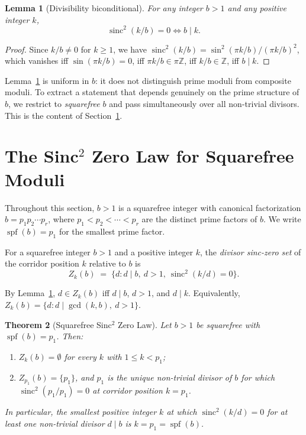\documentclass[11pt,reqno]{amsart}
\theoremstyle{plain}
\newtheorem{theorem}{Theorem}
\newtheorem{lemma}[theorem]{Lemma}
\theoremstyle{remark}
\DeclareMathOperator{\sinc}{sinc}
\DeclareMathOperator{\spf}{spf}
\newcommand{\Z}{\mathbb{Z}}
\begin{document}
\begin{lemma}[Divisibility biconditional]\label{lem:basic}
For any integer $b > 1$ and any positive integer $k$,
\begin{equation}\label{eq:basic}
  \sinc^2(k/b) = 0 \iff b \mid k.
\end{equation}
\end{lemma}

\begin{proof}
Since $k/b \neq 0$ for $k \ge 1$, we have
$\sinc^2(k/b) = \sin^2(\pi k/b) / (\pi k/b)^2$, which vanishes iff
$\sin(\pi k/b) = 0$, iff $\pi k/b \in \pi \Z$, iff $k/b \in \Z$,
iff $b \mid k$.
\end{proof}

Lemma~\ref{lem:basic} is uniform in $b$: it does not distinguish
prime moduli from composite moduli. To extract a statement that
depends genuinely on the prime structure of $b$, we restrict to
\emph{squarefree} $b$ and pass simultaneously over all non-trivial
divisors. This is the content of Section~\ref{sec:main}.

\section{The Sinc$^2$ Zero Law for Squarefree Moduli}\label{sec:main}

Throughout this section, $b > 1$ is a squarefree integer with
canonical factorization $b = p_1 p_2 \cdots p_r$, where
$p_1 < p_2 < \cdots < p_r$ are the distinct prime factors of $b$.
We write $\spf(b) = p_1$ for the smallest prime factor.

\begin{definition}
For a squarefree integer $b > 1$ and a positive integer $k$, the
\emph{divisor sinc-zero set} of the corridor position $k$ relative
to $b$ is
\begin{equation}\label{eq:Z}
  Z_k(b) \;=\; \{ d : d \mid b, \ d > 1, \ \sinc^2(k/d) = 0 \}.
\end{equation}
\end{definition}

By Lemma~\ref{lem:basic}, $d \in Z_k(b)$ iff $d \mid b$, $d > 1$,
and $d \mid k$. Equivalently, $Z_k(b) = \{ d : d \mid \gcd(k, b),
\ d > 1 \}$.

\begin{theorem}[Squarefree Sinc$^2$ Zero Law]\label{thm:main}
Let $b > 1$ be squarefree with $\spf(b) = p_1$. Then:
\begin{enumerate}
\item[(i)] $Z_k(b) = \emptyset$ for every $k$ with
$1 \le k < p_1$;
\item[(ii)] $Z_{p_1}(b) = \{p_1\}$, and $p_1$ is the unique
non-trivial divisor of $b$ for which $\sinc^2(p_1 / p_1) = 0$ at
corridor position $k = p_1$.
\end{enumerate}
In particular, the smallest positive integer $k$ at which
$\sinc^2(k/d) = 0$ for at least one non-trivial divisor $d \mid b$
is $k = p_1 = \spf(b)$.
\end{theorem}
\end{document}
